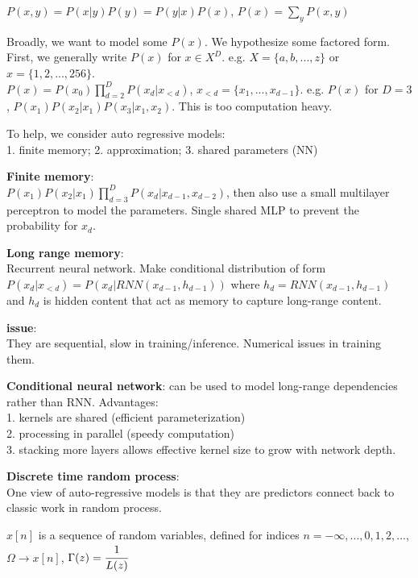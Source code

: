 \documentclass[12pt,a4paper]{article}
\begin{document}
$P(x,y)=P(x|y)P(y)=P(y|x)P(x)$, $P(x)=\sum_yP(x,y)$ 

Broadly, we want to model some $P(x)$. We hypothesize some factored form. \\
First, we generally write $P(x)$ for $x\in X^D$. e.g. $X=\{a,b,...,z\}$ or $x=\{1,2,...,256\}$.\\
$P(x)=P(x_0)\prod_{d=2}^D P(x_d|x_{<d})$, $x_{<d}=\{x_1,...,x_{d-1}\}$. e.g. $P(x)$ for $D=3$, $P(x_1)P(x_2|x_1)P(x_3|x_1,x_2)$. This is too computation heavy. 

To help, we consider auto regressive models:\\
1. finite memory; 2. approximation; 3. shared parameters (NN)

\textbf{Finite memory}: \\
$P(x_1)P(x_2|x_1)\prod_{d=3}^D P(x_d|x_{d-1},x_{d-2})$, then also use a small multilayer perceptron to model the parameters. Single shared MLP to prevent the probability for $x_d$. 


\textbf{Long range memory}: \\
Recurrent neural network. Make conditional distribution of form $P(x_d|x_{<d})=P(x_d|RNN(x_{d-1},h_{d-1}))$ where $h_d=RNN(x_{d-1},h_{d-1})$ and $h_d$ is hidden content that act as memory to capture long-range content. 


\textbf{issue}: \\
They are sequential, slow in training/inference. Numerical issues in training them. 

\textbf{Conditional neural network}: can be used to model long-range dependencies rather than RNN. Advantages:\\
1. kernels are shared (efficient parameterization)\\
2. processing in parallel (speedy computation) \\
3. stacking more layers allows effective kernel size to grow with network depth. 

\vspace{0.5cm}
\textbf{Discrete time random process}:\\
One view of auto-regressive models is that they are predictors connect back to classic work in random process. 

$x[n]$ is a sequence of random variables, defined for indices $n=-\infty,...,0,1,2,...$, \\
$\Omega\rightarrow x[n]$, $\Gamma(z)=\cfrac{1}{L(z)}$
\end{document}
